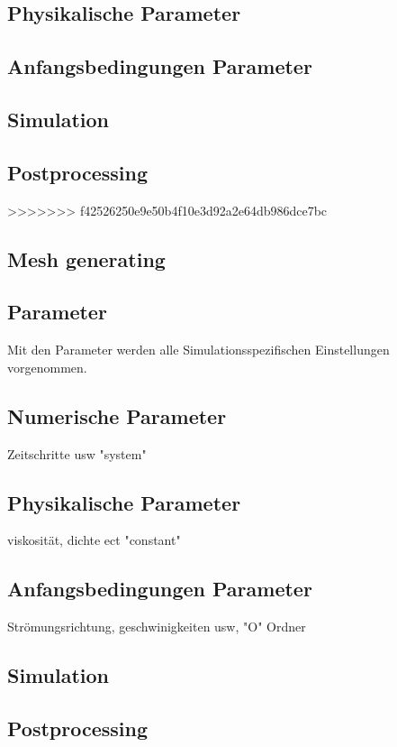 \subsection{Physikalische Parameter\label{openfoam:section:Physikalische Parameter}}
\subsection{Anfangsbedingungen Parameter\label{openfoam:section:Anfangsbedingungen Parameter}}
\subsection{Simulation\label{openfoam:section:Simulation}}
\subsection{Postprocessing\label{openfoam:section:Postprocessing}}
>>>>>>> f42526250e9e50b4f10e3d92a2e64db986dce7bc


\subsection{Mesh generating\label{openfoam:section:Mesh generating}}
\subsection{Parameter\label{openfoam:section:Parameter}}
Mit den Parameter werden alle Simulationsspezifischen Einstellungen vorgenommen.
\subsection{Numerische Parameter\label{openfoam:section:Numerische Parameter}}
Zeitschritte usw "system"
\subsection{Physikalische Parameter\label{openfoam:section:Physikalische Parameter}}
viskosität, dichte ect "constant"
\subsection{Anfangsbedingungen Parameter\label{openfoam:section:Anfangsbedingungen Parameter}}
Strömungsrichtung, geschwinigkeiten usw, "O" Ordner
\subsection{Simulation\label{openfoam:section:Simulation}}
\subsection{Postprocessing\label{openfoam:section:Postprocessing}}


